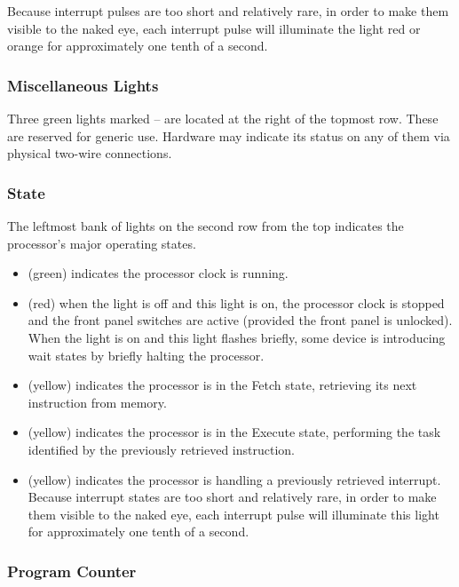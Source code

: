 Because interrupt pulses are too short and relatively rare, in order to make
them visible to the naked eye, each interrupt pulse will illuminate the light
red or orange for approximately one tenth of a second.

\subsubsection{Miscellaneous Lights}

Three green lights marked – are located at the right of the
topmost row. These are reserved for generic use. Hardware may indicate its
status on any of them via physical two-wire connections.

\subsubsection{State}

The leftmost bank of lights on the second row from the top indicates the
processor's major operating states.

\begin{itemize}
\item {} (green) indicates the processor clock is running.
\item {} (red) when the  light is off and this light is
  on, the processor clock is stopped and the front panel switches are
  active (provided the front panel is unlocked). When the 
  light is on and this light flashes briefly, some device is
  introducing wait states by briefly halting the processor.
\item {} (yellow) indicates the processor is in the Fetch state,
  retrieving its next instruction from memory.
\item {} (yellow) indicates the processor is in the Execute state,
  performing the task identified by the previously retrieved instruction.
\item {} (yellow) indicates the processor is handling a previously
  retrieved interrupt. Because interrupt states are too short and relatively
  rare, in order to make them visible to the naked eye, each interrupt pulse
  will illuminate this light for approximately one tenth of a second.
\end{itemize}

\subsubsection{Program Counter}

